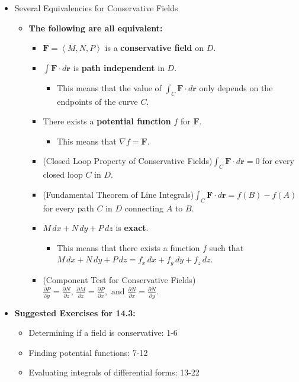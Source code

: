 \documentclass[12pt]{article}
\theoremstyle{plain}
\theoremstyle{definition}
\theoremstyle{remark}
\newcommand{\ds}{\displaystyle}
\newcommand{\vect}[1]{\mathbf{#1}}
\begin{document}
\begin{itemize}
	\item Several Equivalencies for Conservative Fields
		\begin{itemize}
		\item \textbf{The following are all equivalent:}
			\begin{itemize}
			\item $\vect{F}=\left<M,N,P\right>$ is a \textbf{conservative field} on $D$.
			\item $\int\vect{F}\cdot d\vect{r}$ is \textbf{path independent} in $D$.
				\begin{itemize}
				\item This means that the value of $\int_C\vect{F}\cdot d\vect{r}$ only depends on the endpoints of the curve $C$.
				\end{itemize}
			\item There exists a \textbf{potential function} $f$ for $\vect{F}$.
				\begin{itemize}
				\item This means that $\nabla f = \vect{F}$.
				\end{itemize}
			\item (Closed Loop Property of Conservative Fields)\newline $\ds \int_C \vect{F} \cdot d\vect{r} = 0$ for every closed loop $C$ in $D$. 
			\item (Fundamental Theorem of Line Integrals)\newline $\ds \int_C \vect{F} \cdot d\vect{r} = f(B)-f(A)$ for every path $C$ in $D$ connecting $A$ to $B$. 
			\item $M\,dx+N\,dy+P\,dz$ is \textbf{exact}.
				\begin{itemize}
				\item This means that there exists a function $f$ such that $M\,dx+N\,dy+P\,dz = f_x\,dx+f_y\,dy+f_z\,dz$.
				\end{itemize}
			\item (Component Test for Conservative Fields)\newline $\ds \frac{\partial P}{\partial y}=\frac{\partial N}{\partial z},\,\frac{\partial M}{\partial z}=\frac{\partial P}{\partial x},\text{ and }\frac{\partial N}{\partial x}=\frac{\partial N}{\partial y}$. 
			\end{itemize}
		\end{itemize}
	\newpage			
	\item \textbf{Suggested Exercises for 14.3:}
	
		\begin{itemize}
		\item Determining if a field is conservative: 1-6
		\item Finding potential functions: 7-12
		\item Evaluating integrals of differential forms: 13-22
		\end{itemize}
		
	\end{itemize}
	
\end{document}
